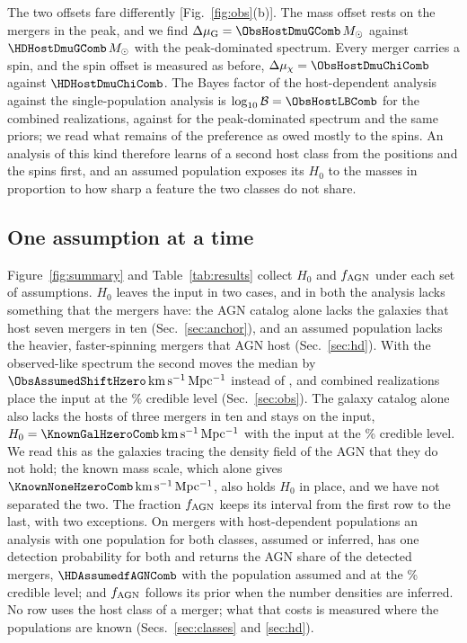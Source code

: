 \documentclass[aps,prd,reprint,twocolumn,superscriptaddress,nofootinbib,floatfix,nolongbibliography]{revtex4-2}
\newcommand{\msun}{\,M_\odot}
\newcommand{\kms}{{\rm km\,s^{-1}\,Mpc^{-1}}}
\newcommand{\fagn}{f_{\rm AGN}}
\newcommand{\dmuG}{\Delta\mu_{\rm G}}
\newcommand{\dmuchi}{\Delta\mu_\chi}
\newcommand{\lB}{\log_{10}\mathcal{B}}
\begin{document}
The two offsets fare differently [Fig.~\ref{fig:obs}(b)]. %
The mass offset
rests on the mergers in the peak, and we find
$\dmuG=\ObsHostDmuGComb\msun$ against $\HDHostDmuGComb\msun$ with the
peak-dominated spectrum. Every merger carries a spin, and the spin offset is
measured as before, $\dmuchi=\ObsHostDmuChiComb$ against
$\HDHostDmuChiComb$. %
The Bayes factor of the host-dependent analysis against the
single-population analysis is $\lB=\ObsHostLBComb$ for the combined
realizations, against \HDHostLBComb{} for the peak-dominated spectrum and
the same priors; we read what remains of the preference as owed mostly to
the spins. %
An analysis of this kind therefore learns of a second host class from the
positions and the spins first, and an assumed population exposes its $H_0$
to the masses in proportion to how sharp a feature the two classes do not
share. %

\subsection{One assumption at a time}
\label{sec:summary}

Figure~\ref{fig:summary} and Table~\ref{tab:results} collect $H_0$ and
$\fagn$ under each set of assumptions. $H_0$ leaves the input in two cases,
and in both the analysis lacks something that the mergers have: the AGN
catalog alone lacks the galaxies that host seven mergers in ten
(Sec.~\ref{sec:anchor}), and an assumed population lacks the heavier,
faster-spinning mergers that AGN host (Sec.~\ref{sec:hd}). With the
observed-like spectrum the second moves the median by
$\ObsAssumedShiftHzero\,\kms$ instead of \HDAssumedShiftHzero, and
\NrealObsAssumed{} combined realizations place the input at the
\ObsAssumedHzeroCL\% credible level (Sec.~\ref{sec:obs}).
The galaxy catalog alone also lacks the hosts of three mergers in ten and
stays on the input, $H_0=\KnownGalHzeroComb\,\kms$ with the input at the
\KnownGalHzeroCL\% credible level. We read this as the galaxies tracing the
density field of the AGN that they do not hold; the known mass scale, which
alone gives $\KnownNoneHzeroComb\,\kms$, also holds $H_0$ in place, and we
have not separated the two.
The fraction $\fagn$ keeps its interval from the first row to the last, with
two exceptions. On mergers with host-dependent populations an analysis with
one population for both classes, assumed or inferred, has one detection
probability for both and returns the AGN share of the detected mergers,
$\HDAssumedfAGNComb$ with the population assumed and \MockfAGN{} at the
\HDAssumedfAGNCL\% credible level; and $\fagn$ follows its prior when the
number densities are inferred. %
No row uses the host class of a merger; what that costs is measured where
the populations are known (Secs.~\ref{sec:classes} and \ref{sec:hd}).
\end{document}
